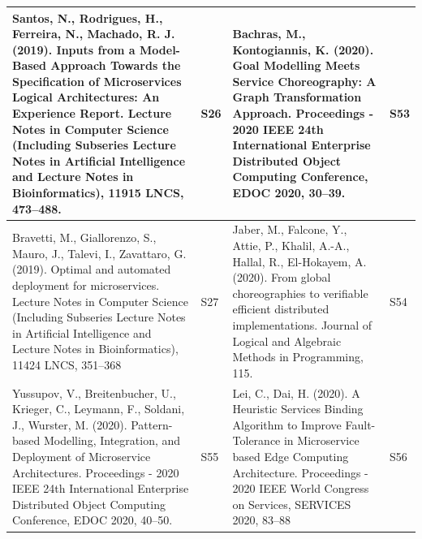 \documentclass{article}
\begin{document}
\begin{appendices}
\begin{table}
\begin{center}
\scriptsize
\begin{tabular}{ | m{20em} | m{1cm}| m{20em} | m{1cm} | }
\hline
Santos, N., Rodrigues, H., Ferreira, N.,  Machado, R. J. (2019). Inputs from a Model-Based Approach Towards the Specification of Microservices Logical Architectures: An Experience Report. Lecture Notes in Computer Science (Including Subseries Lecture Notes in Artificial Intelligence and Lecture Notes in Bioinformatics), 11915 LNCS, 473–488.    & S26            & Bachras, M.,  Kontogiannis, K. (2020). Goal Modelling Meets Service Choreography: A Graph Transformation Approach. Proceedings - 2020 IEEE 24th International Enterprise Distributed Object Computing Conference, EDOC 2020, 30–39.                                                                                                                                                                                            & S53             \\ 
\hline
Bravetti, M., Giallorenzo, S., Mauro, J., Talevi, I.,  Zavattaro, G. (2019). Optimal and automated deployment for microservices. Lecture Notes in Computer Science (Including Subseries Lecture Notes in Artificial Intelligence and Lecture Notes in Bioinformatics), 11424 LNCS, 351–368                                                                & S27            & Jaber, M., Falcone, Y., Attie, P., Khalil, A.-A., Hallal, R.,  El-Hokayem, A. (2020). From global choreographies to verifiable efficient distributed implementations. Journal of Logical and Algebraic Methods in Programming, 115.                                                                                                                                                                                            & S54             \\ 
\hline
Yussupov, V., Breitenbucher, U., Krieger, C., Leymann, F., Soldani, J.,  Wurster, M. (2020). Pattern-based Modelling, Integration, and Deployment of Microservice Architectures. Proceedings - 2020 IEEE 24th International Enterprise Distributed Object Computing Conference, EDOC 2020, 40–50.                                                         & S55            & Lei, C.,  Dai, H. (2020). A Heuristic Services Binding Algorithm to Improve Fault-Tolerance in Microservice based Edge Computing Architecture. Proceedings - 2020 IEEE World Congress on Services, SERVICES 2020, 83–88                                                                                                                                                                                                        & S56             \\ 

\end{tabular}
\end{center}
\end{table}
\end{appendices}
\end{document}

